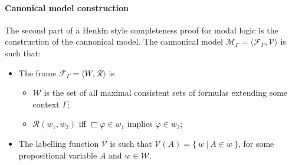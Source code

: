 \documentclass[3p,times]{elsarticle}
\begin{document}
\paragraph{Canonical model construction} The second part of a Henkin style completeness proof for modal logic
is the construction of the cannonical model. The cannonical model
$\mathcal{M}_\Gamma = \langle\mathcal{F}_\Gamma,\mathcal{V}\rangle$ is such that:
\begin{itemize}
  \item The frame $\mathcal{F}_\Gamma = \langle W, \mathcal{R}\rangle$ is
        \begin{itemize}
          \item $\mathcal{W}$ is the set of all maximal consistent sets of formulas extending some context $\Gamma$;
          \item $\mathcal{R}(w_{1},w_{2})$ iff $\Box \varphi \in w_{1}$ implies $\varphi \in w_{2}$;
        \end{itemize}
  \item The labelling function $\mathcal{V}$ is such that $\mathcal{V}(A) = \{\ w\ |\ A\in w\ \}$,
        for some propositional variable $A$ and $w \in \mathcal{W}$.
\end{itemize}
\end{document}
